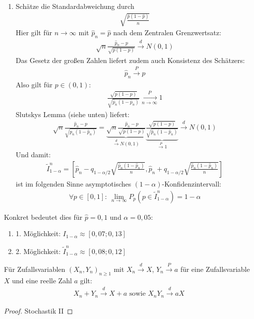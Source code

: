 \documentclass[a4paper]{scrartcl}
\begin{document}
\begin{example}
\begin{enumerate}[1)]
				\item Schätze die Standardabweichung durch 
				\begin{align*}
					\sqrt{\frac{\hat{p}(1-\hat{p})}{n}}
				\end{align*}
				Hier gilt für $n\to\infty$ mit $\hat{p}_n=\hat{p}$ nach dem Zentralen Grenzwertsatz:
				\begin{align*}
					\sqrt{n}\frac{\hat{p}_n-p}{\sqrt{p(1-p)}}\xrightarrow{d}N(0,1)
				\end{align*}
				Das Gesetz der großen Zahlen liefert zudem auch Konsistenz des Schätzers:
			\begin{align*}
				\hat{p}_n\xrightarrow{P}p
			\end{align*}
			Also gilt für $p\in (0,1)$:
			\begin{align*}
				\frac{\sqrt{p(1-p)}}{\sqrt{\hat{p}_n(1-\hat{p}_n)}}\xrightarrow[n\to\infty]{P}1
			\end{align*}
			Slutskys Lemma (siehe unten) liefert:
			\begin{align*}
				\sqrt{n}\frac{\hat{p}_n-p}{\sqrt{\hat{p}_n(1-\hat{p}_n)}}=\underbrace{\sqrt{n}\frac{\hat{p}_n-p}{\sqrt{p(1-p)}}}_{\xrightarrow{d}N(0,1)}\underbrace{\frac{\sqrt{p(1-p)}}{\sqrt{\hat{p}_n(1-\hat{p}_n)}}}_{\xrightarrow{P}1}\xrightarrow{d}N(0,1)
			\end{align*}
			Und damit:
			\begin{align*}
				\tilde{I}_{1-\alpha}^n=\left[\hat{p}_n-q_{1-\alpha/2}\sqrt{\frac{\hat{p}_n(1-\hat{p}_n)}{n}},\hat{p}_n+q_{1-\alpha/2}\sqrt{\frac{\hat{p}_n(1-\hat{p}_n)}{n}}\right]
			\end{align*}
			ist im folgenden Sinne asymptotisches $(1-\alpha)$-Konfidenzintervall:
			\begin{align*}
				\forall p\in [0,1]\colon~\lim_{n\to\infty}P_p\left(p\in\tilde{I}_{1-\alpha}^n\right)=1-\alpha
			\end{align*}
		\end{enumerate}
		Konkret bedeutet dies für $\hat{p}=0,1$ und $\alpha=0,05$:
		\begin{enumerate}
			\item[]1. Möglichkeit: $I_{1-\alpha}\approx [0,07;0,13]$
			\item[]2. Möglichkeit: $\tilde{I}_{1-\alpha}^n\approx[0,08;0,12]$
		\end{enumerate}
		\end{example}
		\begin{lemma}
			Für Zufallsvariablen $(X_n,Y_n)_{n\ge 1}$ mit $X_n\xrightarrow{d}X$, $Y_n\xrightarrow{P}a$ für eine Zufallsvariable $X$ und eine reelle Zahl $a$ gilt:
			\begin{align*}
				X_n+Y_n\xrightarrow{d}X+a\text{ sowie }X_nY_n\xrightarrow{d}aX
			\end{align*}
		\end{lemma}
		\begin{proof}
			Stochastik II
		\end{proof}
				
\end{document}
